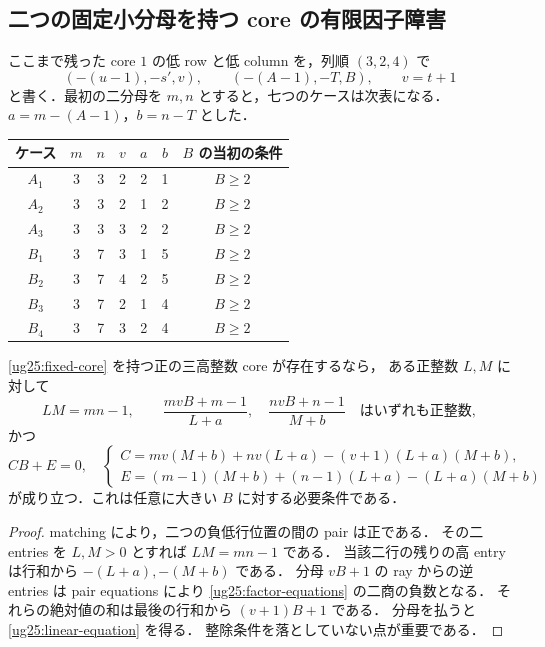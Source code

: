 \subsection{二つの固定小分母を持つ core の有限因子障害}

ここまで残った core $1$ の低 row と低 column を，列順 $(3,2,4)$ で
\begin{equation}\label{ug25:fixed-core}
 (-(u-1),-s',v),\qquad (-(A-1),-T,B),\qquad v=t+1
\end{equation}
と書く．最初の二分母を $m,n$ とすると，七つのケースは次表になる．
$a=m-(A-1)$，$b=n-T$ とした．
\begin{center}\small
\begin{tabular}{c|cc|ccc|c}
ケース&$m$&$n$&$v$&$a$&$b$&$B$ の当初の条件\\\hline
$A_1$&3&3&2&2&1&$B\ge2$\\
$A_2$&3&3&2&1&2&$B\ge2$\\
$A_3$&3&3&3&2&2&$B\ge2$\\\hline
$B_1$&3&7&3&1&5&$B\ge2$\\
$B_2$&3&7&4&2&5&$B\ge2$\\
$B_3$&3&7&2&1&4&$B\ge2$\\
$B_4$&3&7&3&2&4&$B\ge2$
\end{tabular}
\end{center}

\begin{lemma}[固定二分母の因子判定]\label{ug25:factor-test}
\eqref{ug25:fixed-core} を持つ正の三高整数 core が存在するなら，
ある正整数 $L,M$ に対して
\begin{equation}\label{ug25:factor-equations}
 LM=mn-1,\qquad
 \frac{mvB+m-1}{L+a},\quad
 \frac{nvB+n-1}{M+b}\quad\text{はいずれも正整数},
\end{equation}
かつ
\begin{equation}\label{ug25:linear-equation}
 CB+E=0,
 \quad
 \begin{cases}
 C=mv(M+b)+nv(L+a)-(v+1)(L+a)(M+b),\\
 E=(m-1)(M+b)+(n-1)(L+a)-(L+a)(M+b)
 \end{cases}
\end{equation}
が成り立つ．これは任意に大きい $B$ に対する必要条件である．
\end{lemma}

\begin{proof}
matching により，二つの負低行位置の間の pair は正である．
その二 entries を $L,M>0$ とすれば $LM=mn-1$ である．
当該二行の残りの高 entry は行和から $-(L+a),-(M+b)$ である．
分母 $vB+1$ の ray からの逆 entries は pair equations により
\eqref{ug25:factor-equations} の二商の負数となる．
それらの絶対値の和は最後の行和から $(v+1)B+1$ である．
分母を払うと \eqref{ug25:linear-equation} を得る．
整除条件を落としていない点が重要である．
\end{proof}

